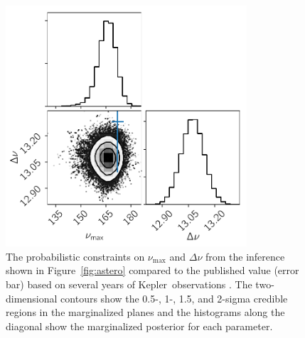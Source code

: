 \documentclass[manuscript, letterpaper]{aastex6}
\newcommand{\project}[1]{\textsf{#1}}
\newcommand{\kepler}{\project{Kepler}}
\newcommand{\figureref}[1]{\ref{fig:#1}}
\newcommand{\Figure}[1]{Figure~\figureref{#1}}
\newcommand{\figurelabel}[1]{\label{fig:#1}}
\begin{document}
\begin{figure}[!p]
\begin{center}
\includegraphics[width=0.8\textwidth]{figures/astero/astero-corner.pdf}
\caption{The probabilistic constraints on $\nu_\mathrm{max}$ and $\Delta \nu$
    from the inference shown in \Figure{astero} compared to the published
    value (error bar) based on several years of \kepler\ observations
    \citep{Pinsonneault:2014}.
    The two-dimensional contours show the 0.5-, 1-, 1.5, and 2-sigma credible
    regions in the marginalized planes and the histograms along the diagonal
    show the marginalized posterior for each parameter.
    \figurelabel{astero-corner}}
\end{center}
\end{figure}
\end{document}
